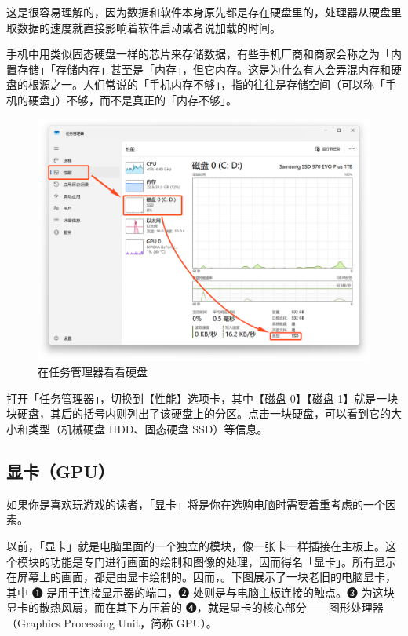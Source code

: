 这是很容易理解的，因为数据和软件本身原先都是存在硬盘里的，处理器从硬盘里取数据的速度就直接影响着软件启动或者说加载的时间。

\begin{note}
  手机中用类似固态硬盘一样的芯片来存储数据，有些手机厂商和商家会称之为「内置存储」「存储内存」甚至是「内存」，但它内存。这是为什么有人会弄混内存和硬盘的根源之一。人们常说的「手机内存不够」，指的往往是存储空间（可以称「手机的硬盘」）不够，而不是真正的「内存不够」。
\end{note}

\begin{figure}[htb!]
  \centering
  \includegraphics[width=.65\textwidth]{assets/basic/Check_disk_status.png}
  \caption{在任务管理器看看硬盘}
  \label{fig:Check_disk_status}
\end{figure}

打开「任务管理器」，切换到【性能】选项卡，其中【磁盘 0】【磁盘 1】就是一块块硬盘，其后的括号内则列出了该硬盘上的分区。点击一块硬盘，可以看到它的大小和类型（机械硬盘 HDD、固态硬盘 SSD）等信息。

\subsection{显卡（GPU）}

如果你是喜欢玩游戏的读者，「显卡」将是你在选购电脑时需要着重考虑的一个因素。

以前，「显卡」就是电脑里面的一个独立的模块，像一张卡一样插接在主板上。这个模块的功能是专门进行画面的绘制和图像的处理，因而得名「显卡」。所有显示在屏幕上的画面，都是由显卡绘制的。因而，。下图展示了一块老旧的电脑显卡，其中 ➊ 是用于连接显示器的端口，➋ 处则是与电脑主板连接的触点。➌ 为这块显卡的散热风扇，而在其下方压着的 ➍，就是显卡的核心部分——图形处理器（Graphics Processing Unit，简称 GPU）。

